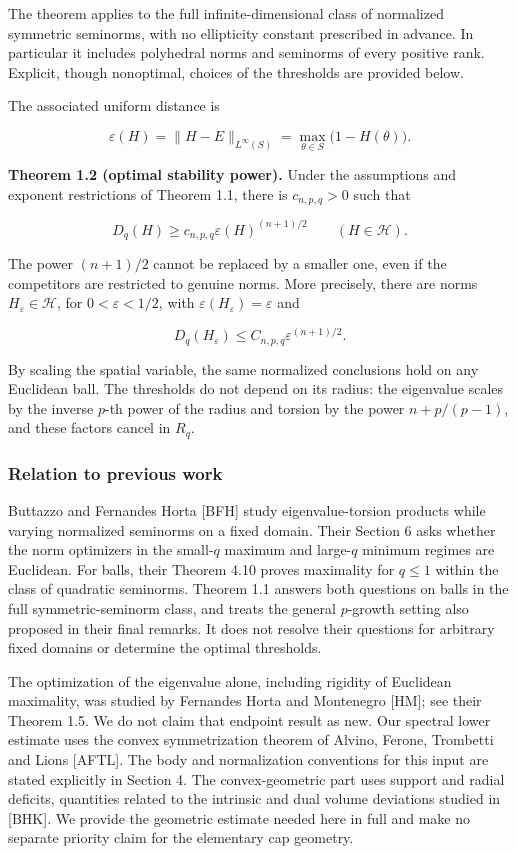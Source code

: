 \documentclass[11pt]{article}
\begin{document}
The theorem applies to the full infinite-dimensional class of normalized
symmetric seminorms, with no ellipticity constant prescribed in advance.
In particular it includes polyhedral norms and seminorms of every
positive rank. Explicit, though nonoptimal, choices of the thresholds
are provided below.

The associated uniform distance is

\[
\varepsilon(H)=\|H-E\|_{L^\infty(S)}
=\max_{\theta\in S}\bigl(1-H(\theta)\bigr).
\tag{1.7}
\]

\textbf{Theorem 1.2 (optimal stability power).} Under the assumptions
and exponent restrictions of Theorem 1.1, there is \(c_{n,p,q}>0\) such
that

\[
D_q(H)\geq c_{n,p,q}\varepsilon(H)^{(n+1)/2}
\qquad(H\in\mathcal H).
\tag{1.8}
\]

The power \((n+1)/2\) cannot be replaced by a smaller one, even if the
competitors are restricted to genuine norms. More precisely, there are
norms \(H_\varepsilon\in\mathcal H\), for \(0<\varepsilon<1/2\), with
\(\varepsilon(H_\varepsilon)=\varepsilon\) and

\[
D_q(H_\varepsilon)\leq C_{n,p,q}\varepsilon^{(n+1)/2}.
\tag{1.9}
\]

By scaling the spatial variable, the same normalized conclusions hold on
any Euclidean ball. The thresholds do not depend on its radius: the
eigenvalue scales by the inverse \(p\)-th power of the radius and
torsion by the power \(n+p/(p-1)\), and these factors cancel in \(R_q\).

\subsubsection{Relation to previous
work}\label{relation-to-previous-work}

Buttazzo and Fernandes Horta {[}BFH{]} study eigenvalue-torsion products
while varying normalized seminorms on a fixed domain. Their Section 6
asks whether the norm optimizers in the small-\(q\) maximum and
large-\(q\) minimum regimes are Euclidean. For balls, their Theorem 4.10
proves maximality for \(q\leq1\) within the class of quadratic
seminorms. Theorem 1.1 answers both questions on balls in the full
symmetric-seminorm class, and treats the general \(p\)-growth setting
also proposed in their final remarks. It does not resolve their
questions for arbitrary fixed domains or determine the optimal
thresholds.

The optimization of the eigenvalue alone, including rigidity of
Euclidean maximality, was studied by Fernandes Horta and Montenegro
{[}HM{]}; see their Theorem 1.5. We do not claim that endpoint result as
new. Our spectral lower estimate uses the convex symmetrization theorem
of Alvino, Ferone, Trombetti and Lions {[}AFTL{]}. The body and
normalization conventions for this input are stated explicitly in
Section 4. The convex-geometric part uses support and radial deficits,
quantities related to the intrinsic and dual volume deviations studied
in {[}BHK{]}. We provide the geometric estimate needed here in full and
make no separate priority claim for the elementary cap geometry.
\end{document}
